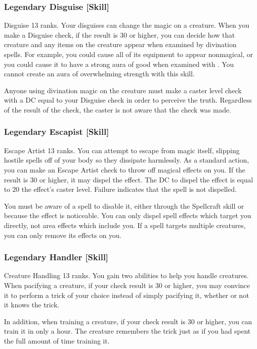 \subsubsection{Legendary Disguise [Skill]}
\featpre Disguise 13 ranks.
\featben Your disguises can change the magic on a creature. When you make a Disguise check, if the result is 30 or higher, you can decide how that creature and any items on the creature appear when examined by divination spells. For example, you could cause all of its equipment to appear nonmagical, or you could cause it to have a strong aura of good when examined with . You cannot create an aura of overwhelming strength with this skill.

Anyone using divination magic on the creature must make a caster level check with a DC equal to your Disguise check in order to perceive the truth. Regardless of the result of the check, the caster is not aware that the check was made.

\subsubsection{Legendary Escapist [Skill]}
\featpre Escape Artist 13 ranks.
\featben You can attempt to escape from magic itself, slipping hostile spells off of your body so they dissipate harmlessly. As a standard action, you can make an Escape Artist check to throw off magical effects on you. If the result is 30 or higher, it may dispel the effect. The DC to dispel the effect is equal to 20 \add the effect's caster level. Failure indicates that the spell is not dispelled.

You must be aware of a spell to disable it, either through the Spellcraft skill or because the effect is noticeable. You can only dispel spell effects which target you directly, not area effects which include you. If a spell targets multiple creatures, you can only remove its effects on you.

\subsubsection{Legendary Handler [Skill]}
\featpre Creature Handling 13 ranks.
\featben You gain two abilities to help you handle creatures. When pacifying a creature, if your check result is 30 or higher, you may convince it to perform a trick of your choice instead of simply pacifying it, whether or not it knows the trick.

In addition, when training a creature, if your check result is 30 or higher, you can train it in only a hour. The creature remembers the trick just as if you had spent the full amount of time training it.

